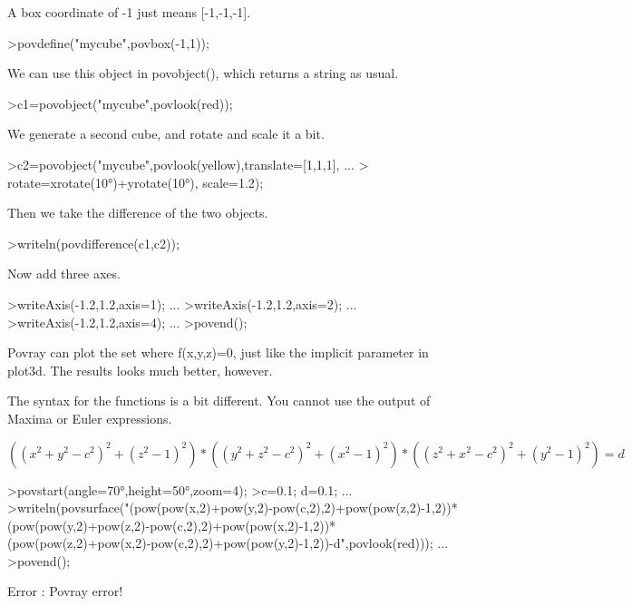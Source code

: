 \documentclass[a4paper,10pt]{article}
\begin{document}
\begin{eulernotebook}
\begin{eulercomment}
A box coordinate of -1 just means [-1,-1,-1].
\end{eulercomment}
\begin{eulerprompt}
>povdefine("mycube",povbox(-1,1));
\end{eulerprompt}
\begin{eulercomment}
We can use this object in povobject(), which returns a string as
usual.
\end{eulercomment}
\begin{eulerprompt}
>c1=povobject("mycube",povlook(red));
\end{eulerprompt}
\begin{eulercomment}
We generate a second cube, and rotate and scale it a bit.
\end{eulercomment}
\begin{eulerprompt}
>c2=povobject("mycube",povlook(yellow),translate=[1,1,1], ...
>  rotate=xrotate(10°)+yrotate(10°), scale=1.2);
\end{eulerprompt}
\begin{eulercomment}
Then we take the difference of the two objects.
\end{eulercomment}
\begin{eulerprompt}
>writeln(povdifference(c1,c2));
\end{eulerprompt}
\begin{eulercomment}
Now add three axes.
\end{eulercomment}
\begin{eulerprompt}
>writeAxis(-1.2,1.2,axis=1); ...
>writeAxis(-1.2,1.2,axis=2); ...
>writeAxis(-1.2,1.2,axis=4); ...
>povend();
\end{eulerprompt}
\begin{eulercomment}
Povray can plot the set where f(x,y,z)=0, just like the implicit parameter in plot3d. The results looks much better,
however.

The syntax for the functions is a bit different. You cannot use the output of Maxima or Euler expressions.

\end{eulercomment}
\begin{eulerformula}
\[
((x^2+y^2-c^2)^2+(z^2-1)^2)*((y^2+z^2-c^2)^2+(x^2-1)^2)*((z^2+x^2-c^2)^2+(y^2-1)^2)=d
\]
\end{eulerformula}
\begin{eulerprompt}
>povstart(angle=70°,height=50°,zoom=4);
>c=0.1; d=0.1; ...
>writeln(povsurface("(pow(pow(x,2)+pow(y,2)-pow(c,2),2)+pow(pow(z,2)-1,2))*(pow(pow(y,2)+pow(z,2)-pow(c,2),2)+pow(pow(x,2)-1,2))*(pow(pow(z,2)+pow(x,2)-pow(c,2),2)+pow(pow(y,2)-1,2))-d",povlook(red))); ...
>povend();
\end{eulerprompt}
\begin{euleroutput}
  Error : Povray error!
  

\end{euleroutput}
\end{eulernotebook}
\end{document}
